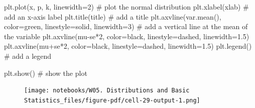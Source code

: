 \documentclass[
  letterpaper,
  DIV=11,
  numbers=noendperiod]{scrreprt}
\newenvironment{Shaded}{\begin{snugshade}}{\end{snugshade}}
\newcommand{\CommentTok}[1]{\textcolor[rgb]{0.37,0.37,0.37}{#1}}
\newcommand{\DecValTok}[1]{\textcolor[rgb]{0.68,0.00,0.00}{#1}}
\newcommand{\FloatTok}[1]{\textcolor[rgb]{0.68,0.00,0.00}{#1}}
\newcommand{\NormalTok}[1]{\textcolor[rgb]{0.00,0.23,0.31}{#1}}
\newcommand{\OperatorTok}[1]{\textcolor[rgb]{0.37,0.37,0.37}{#1}}
\newcommand{\StringTok}[1]{\textcolor[rgb]{0.13,0.47,0.30}{#1}}
\begin{document}
\begin{Shaded}
\begin{Highlighting}[]
\NormalTok{            plt.plot(x, p, }\StringTok{\textquotesingle{}k\textquotesingle{}}\NormalTok{, linewidth}\OperatorTok{=}\DecValTok{2}\NormalTok{) }\CommentTok{\# plot the normal distribution}
\NormalTok{            plt.xlabel(xlab) }\CommentTok{\# add an x{-}axis label}
\NormalTok{            plt.title(title) }\CommentTok{\# add a title}
\NormalTok{            plt.axvline(var.mean(), color}\OperatorTok{=}\StringTok{\textquotesingle{}green\textquotesingle{}}\NormalTok{, linestyle}\OperatorTok{=}\StringTok{\textquotesingle{}solid\textquotesingle{}}\NormalTok{, linewidth}\OperatorTok{=}\DecValTok{3}\NormalTok{) }\CommentTok{\# add a vertical line at the mean of the variable}
\NormalTok{            plt.axvline(mu}\OperatorTok{{-}}\NormalTok{se}\OperatorTok{*}\DecValTok{2}\NormalTok{, color}\OperatorTok{=}\StringTok{\textquotesingle{}black\textquotesingle{}}\NormalTok{, linestyle}\OperatorTok{=}\StringTok{\textquotesingle{}dashed\textquotesingle{}}\NormalTok{, linewidth}\OperatorTok{=}\FloatTok{1.5}\NormalTok{)}
\NormalTok{            plt.axvline(mu}\OperatorTok{+}\NormalTok{se}\OperatorTok{*}\DecValTok{2}\NormalTok{, color}\OperatorTok{=}\StringTok{\textquotesingle{}black\textquotesingle{}}\NormalTok{, linestyle}\OperatorTok{=}\StringTok{\textquotesingle{}dashed\textquotesingle{}}\NormalTok{, linewidth}\OperatorTok{=}\FloatTok{1.5}\NormalTok{)}
\NormalTok{            plt.legend() }\CommentTok{\# add a legend}
            
\NormalTok{        plt.show()  }\CommentTok{\# show the plot }
\end{Highlighting}
\end{Shaded}

\begin{Shaded}
\end{Shaded}

\begin{figure}[H]

{\centering \texttt{[image: notebooks/W05. Distributions and Basic Statistics\_files/figure-pdf/cell-29-output-1.png]}

}

\end{figure}
\end{document}
